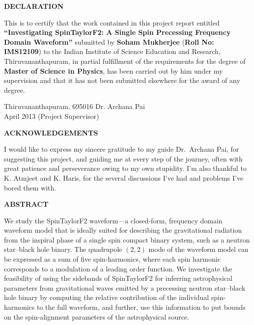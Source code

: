 \documentclass[12pt, a4wide]{report}
\begin{document}
\setcounter{page}{2}
\begin{center}
{\textbf{DECLARATION}}
\end{center}

\noindent
This is to certify that the work contained in this project report entitled
\textbf{``Investigating SpinTaylorF2: A Single Spin Precessing Frequency
Domain Waveform''}  submitted by \textbf{Soham Mukherjee} (\textbf{Roll No:
IMS12109}) to the Indian Institute of Science Education and Research,
Thiruvananthapuram, in partial fulfillment of the requirements for the degree
of {\bf Master of Science in Physics}, has been carried out by
him under my supervision and that it has not been submitted elsewhere for the
award of any degree.

\vspace{4cm}

\noindent Thiruvananthapuram, 695016 \hfill Dr. Archana Pai\\
\noindent April 2013 \hfill (Project Supervisor)

\clearpage

\begin{center}
\textbf{ACKNOWLEDGEMENTS}\\
\end{center}

I would like to express my sincere gratitude to my guide Dr.~Archana Pai,
for suggesting this project, and guiding me at every step of the journey, 
often with great patience and perseverance owing to my own stupidity. 
I'm also thankful to K. Atmjeet and K. Haris, for the several discussions I've 
had and problems I've bored them with.


\clearpage

\begin{center}
\textbf{ABSTRACT}\\
\end{center}

We study the SpinTaylorF2 waveform---a closed-form, frequency domain waveform
model that is ideally suited for describing the gravitational radiation from
the inspiral phase of a single spin compact binary system, such as a neutron
star--black hole binary. The quadrupole $(2,2)$ mode of the waveform model can
be expressed as a sum of five spin-harmonics, where each spin harmonic
corresponds to a modulation of a leading order function. We investigate the
feasibility of using the sidebands of SpinTaylorF2 for inferring astrophysical
parameters from gravitational waves emitted by a precessing neutron 
star--black hole binary by computing the relative contribution of the individual
spin-harmonics to the full waveform, and further, use this information to put
bounds on the spin-alignment parameters of the astrophysical source.
\end{document}
